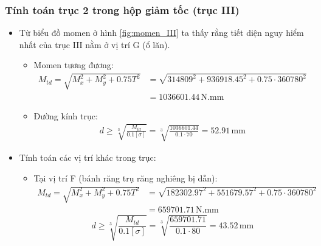             \subsubsection{Tính toán trục 2 trong hộp giảm tốc (trục III)}
                \begin{itemize}
                    \item Từ biểu đồ momen ở hình \ref{fig:momen_III} ta thấy rằng tiết diện nguy hiểm nhất của trục III nằm ở vị trí G (ổ lăn).
                        \begin{itemize}
                            \item Momen tương đương:
                                \begin{align*}
                                    M_{td} = \sqrt{M_{x}^2 + M_{y}^2 +  0.75T^2} &= \sqrt{314809^2 + 936918.45^2 + 0.75 \cdot 360780^2} \\
                                                                                 &= 1036601.44 \, \mathrm{N.mm}
                                \end{align*}
                            \item Đường kính trục:
                                \begin{align*}
                                    d \geq \sqrt[3]{\frac{M_{td}}{0.1 [\sigma]}} = \sqrt[3]{\frac{1036601.44}{0.1 \cdot 70}} = 52.91\, \mathrm{mm}
                                \end{align*} 
                        \end{itemize}
                    \item Tính toán các vị trí khác trong trục:
                        \begin{itemize}
                            \item Tại vị trí F (bánh răng trụ răng nghiêng bị dẫn):
                                \begin{align*}
                                    M_{td} = \sqrt{M_{x}^2 + M_{y}^2 +  0.75T^2} &= \sqrt{182302.97^2 + 551679.57^2 + 0.75 \cdot 360780^2} \\
                                                                                 &= 659701.71 \, \mathrm{N.mm}
                                \end{align*}
                                \[
                                    d \geq \sqrt[3]{\frac{M_{td}}{0.1 [\sigma]}} = \sqrt[3]{\frac{659701.71}{0.1 \cdot 80}} = 43.52 \, \mathrm{mm}
                                \]

\end{itemize}
\end{itemize}
